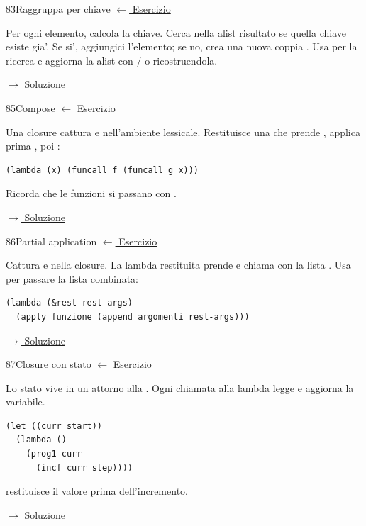 \label{hint:83}
\begin{hintbox}{83}{Raggruppa per chiave}
\small\color{black!55}\hyperref[ex:83]{$\leftarrow$ Esercizio}\normalsize\color{black}

Per ogni elemento, calcola la chiave. Cerca nella alist risultato
se quella chiave esiste gia'. Se si', aggiungici l'elemento;
se no, crea una nuova coppia .
Usa  per la ricerca e aggiorna la alist con /
o ricostruendola.

\small\color{black!55}\hyperref[sol:83]{$\rightarrow$ Soluzione}\normalsize\color{black}
\end{hintbox}

\label{hint:85}
\begin{hintbox}{85}{Compose}
\small\color{black!55}\hyperref[ex:85]{$\leftarrow$ Esercizio}\normalsize\color{black}

Una closure cattura  e  nell'ambiente lessicale.
Restituisce una  che prende , applica prima
, poi :
\begin{lstlisting}
(lambda (x) (funcall f (funcall g x)))
\end{lstlisting}
Ricorda che le funzioni si passano con .

\small\color{black!55}\hyperref[sol:85]{$\rightarrow$ Soluzione}\normalsize\color{black}
\end{hintbox}

\label{hint:86}
\begin{hintbox}{86}{Partial application}
\small\color{black!55}\hyperref[ex:86]{$\leftarrow$ Esercizio}\normalsize\color{black}

Cattura  e  nella closure.
La lambda restituita prende  e chiama
 con la lista .
Usa  per passare la lista combinata:
\begin{lstlisting}
(lambda (&rest rest-args)
  (apply funzione (append argomenti rest-args)))
\end{lstlisting}

\small\color{black!55}\hyperref[sol:86]{$\rightarrow$ Soluzione}\normalsize\color{black}
\end{hintbox}

\label{hint:87}
\begin{hintbox}{87}{Closure con stato}
\small\color{black!55}\hyperref[ex:87]{$\leftarrow$ Esercizio}\normalsize\color{black}

Lo stato vive in un  attorno alla .
Ogni chiamata alla lambda legge e aggiorna la variabile.
\begin{lstlisting}
(let ((curr start))
  (lambda ()
    (prog1 curr
      (incf curr step))))
\end{lstlisting}
 restituisce il valore prima dell'incremento.

\small\color{black!55}\hyperref[sol:87]{$\rightarrow$ Soluzione}\normalsize\color{black}
\end{hintbox}

